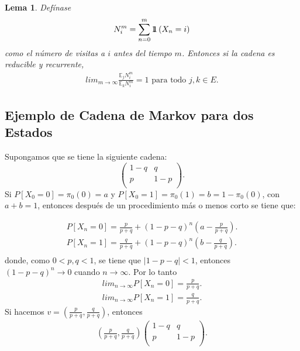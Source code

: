 \documentclass{article}
\newtheorem{Lema}{Lema}[section]
\newcommand{\esp}{\mathbb{E}}
\newcommand{\indora}{\mbox{$1$\hspace{-0.8ex}$1$}}
\numberwithin{equation}{section}
\begin{document}
\begin{Lema}
Def\'inase 
\begin{eqnarray}
N_{i}^{m}=\sum_{n=0}^{m}\indora\left(X_{n}=i\right)
\end{eqnarray} 
como el n\'umero de visitas a $i$ antes del tiempo $m$. Entonces si la cadena es reducible y recurrente, 
\begin{eqnarray}
lim_{m\rightarrow\infty}\frac{\esp_{j}N_{i}^{m}}{\esp_{k}N_{i}^{m}}=1\textrm{ para todo }j,k\in E.
\end{eqnarray}
\end{Lema}

%
\subsection{Ejemplo de Cadena de Markov para dos Estados}

Supongamos que se tiene la siguiente cadena:
\begin{equation}
\left(\begin{array}{cc}
1-q & q\\
p & 1-p\\
\end{array}
\right).
\end{equation}
Si $P\left[X_{0}=0\right]=\pi_{0}(0)=a$ y $P\left[X_{0}=1\right]=\pi_{0}(1)=b=1-\pi_{0}(0)$, con $a+b=1$, entonces despu\'es de un procedimiento m\'as o menos corto se tiene que:

\begin{eqnarray*}
P\left[X_{n}=0\right]=\frac{p}{p+q}+\left(1-p-q\right)^{n}\left(a-\frac{p}{p+q}\right).\\
P\left[X_{n}=1\right]=\frac{q}{p+q}+\left(1-p-q\right)^{n}\left(b-\frac{q}{p+q}\right).\\
\end{eqnarray*}
donde, como $0<p,q<1$, se tiene que $|1-p-q|<1$, entonces $\left(1-p-q\right)^{n}\rightarrow 0$ cuando $n\rightarrow\infty$. Por lo tanto
\begin{eqnarray*}
lim_{n\rightarrow\infty}P\left[X_{n}=0\right]=\frac{p}{p+q}.\\
lim_{n\rightarrow\infty}P\left[X_{n}=1\right]=\frac{q}{p+q}.
\end{eqnarray*}
Si hacemos $v=\left(\frac{p}{p+q},\frac{q}{p+q}\right)$, entonces
\begin{eqnarray*}
\left(\frac{p}{p+q},\frac{q}{p+q}\right)\left(\begin{array}{cc}
1-q & q\\
p & 1-p\\
\end{array}\right).
\end{eqnarray*}
\end{document}
